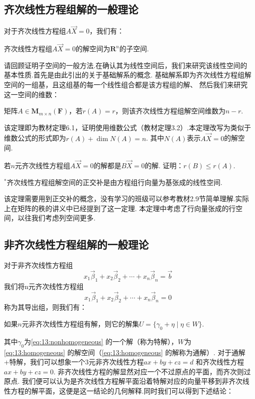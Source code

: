 \subsection{齐次线性方程组解的一般理论}
对于齐次线性方程组$A\vec{X}=0$，我们有：
\begin{theorem}
    齐次线性方程组$A\vec{X}=0$的解空间为$\mathbf{R}^n$的子空间.
\end{theorem}
请回顾证明子空间的一般方法.在确认其为线性空间后，我们来研究该线性空间的基本性质.首先是由此引出的关于基础解系的概念.
基础解系即为齐次线性方程组解空间的一组基，且这组基的每一个线性组合都是该方程组的解、
然后我们来研究这一空间的维数：
\begin{theorem}
    矩阵$A \in \mathbf{M}_{m \times n}(\mathbf{F})$，若$r(A) = r$，则该齐次线性方程组解空间维数为$n - r$.
\end{theorem}
该定理即为教材定理6.1，证明使用维数公式（教材定理3.2）.本定理改写为类似于维数公式的形式即为$r(A) + \dim N(A) = n$.
其中$N(A)$表示$A\vec{X}=0$的解空间.
\begin{example}
    若$n$元齐次线性方程组$A\vec{X} = 0$的解都是$B\vec{X} = 0$的解. 证明：$r(B) \leqslant r(A)$.
\end{example}
\begin{theorem}
    $^*$齐次线性方程组解空间的正交补是由方程组行向量为基张成的线性空间.
\end{theorem}
该定理需要用到正交补的概念，没有学习的班级可以参考教材2.9节简单理解.实际上在矩阵的秩的讲义中已经提到了这一定理.
本定理中考虑了行向量张成的行空间，以往我们考虑列空间更多.

\subsection{非齐次线性方程组解的一般理论}
对于非齐次线性方程组
\begin{equation} \label{eq:13:nonhomogeneous}
    x_1\vec{\beta}_1+x_2\vec{\beta}_2+\cdots+x_n\vec{\beta}_n=\vec{b}
\end{equation}
我们将n元齐次线性方程组
\begin{equation} \label{eq:13:homogeneous}
    x_1\vec{\beta}_1+x_2\vec{\beta}_2+\cdots+x_n\vec{\beta}_n=0
\end{equation}
称为其导出组，则我们有：
\begin{theorem}
    如果$n$元非齐次线性方程组有解，则它的解集$U=\{\gamma_0+\eta \mid \eta \in W\}$.
\end{theorem}
其中$\gamma_0$为\autoref{eq:13:nonhomogeneous} 的一个解（称为特解），$W$为\autoref{eq:13:homogeneous} 的解空间（\autoref*{eq:13:homogeneous} 的解称为通解）.
对于通解+特解，我们可以想象一个3元非齐次线性方程$ax + by + cz = d$ 和齐次线性方程$ax + by + cz = 0$.
非齐次线性方程的解显然对应一个不过原点的平面，而齐次则过原点.
我们便可以认为是齐次线性方程解平面沿着特解对应的向量平移到非齐次线性方程的解平面，这便是这一结论的几何解释.同时我们可以得到下述结论：

